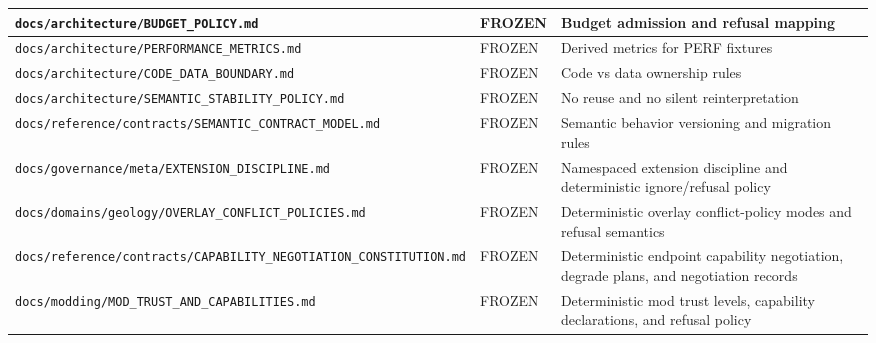 \documentclass[9pt,a4paper,openany]{book}
\newcommand{\toprule}{\hline}
\newcommand{\midrule}{\hline}
\newcommand{\bottomrule}{\hline}
\begin{document}
\begin{center}
{\small\renewcommand{\arraystretch}{1.18}
\begin{tabularx}{\linewidth}{@{}>{\raggedright\arraybackslash}X >{\raggedright\arraybackslash}X >{\raggedright\arraybackslash}X@{}}
\toprule
\textbf{\texttt{docs/\allowbreak{}architecture/\allowbreak{}BUDGET\_\allowbreak{}POLICY.\allowbreak{}md}} & \textbf{FROZEN} & \textbf{Budget admission and refusal mapping} \\
\midrule
\texttt{docs/\allowbreak{}architecture/\allowbreak{}PERFORMANCE\_\allowbreak{}METRICS.\allowbreak{}md} & FROZEN & Derived metrics for PERF fixtures \\
\texttt{docs/\allowbreak{}architecture/\allowbreak{}CODE\_\allowbreak{}DATA\_\allowbreak{}BOUNDARY.\allowbreak{}md} & FROZEN & Code vs data ownership rules \\
\texttt{docs/\allowbreak{}architecture/\allowbreak{}SEMANTIC\_\allowbreak{}STABILITY\_\allowbreak{}POLICY.\allowbreak{}md} & FROZEN & No reuse and no silent reinterpretation \\
\texttt{docs/\allowbreak{}reference/\allowbreak{}contracts/\allowbreak{}SEMANTIC\_\allowbreak{}CONTRACT\_\allowbreak{}MODEL.\allowbreak{}md} & FROZEN & Semantic behavior versioning and migration rules \\
\texttt{docs/\allowbreak{}governance/\allowbreak{}meta/\allowbreak{}EXTENSION\_\allowbreak{}DISCIPLINE.\allowbreak{}md} & FROZEN & Namespaced extension discipline and deterministic ignore/\allowbreak{}refusal policy \\
\texttt{docs/\allowbreak{}domains/\allowbreak{}geology/\allowbreak{}OVERLAY\_\allowbreak{}CONFLICT\_\allowbreak{}POLICIES.\allowbreak{}md} & FROZEN & Deterministic overlay conflict-\allowbreak{}policy modes and refusal semantics \\
\texttt{docs/\allowbreak{}reference/\allowbreak{}contracts/\allowbreak{}CAPABILITY\_\allowbreak{}NEGOTIATION\_\allowbreak{}CONSTITUTION.\allowbreak{}md} & FROZEN & Deterministic endpoint capability negotiation, degrade plans, and negotiation records \\
\texttt{docs/\allowbreak{}modding/\allowbreak{}MOD\_\allowbreak{}TRUST\_\allowbreak{}AND\_\allowbreak{}CAPABILITIES.\allowbreak{}md} & FROZEN & Deterministic mod trust levels, capability declarations, and refusal policy \\
\bottomrule
\end{tabularx}
}
\end{center}
\end{document}
